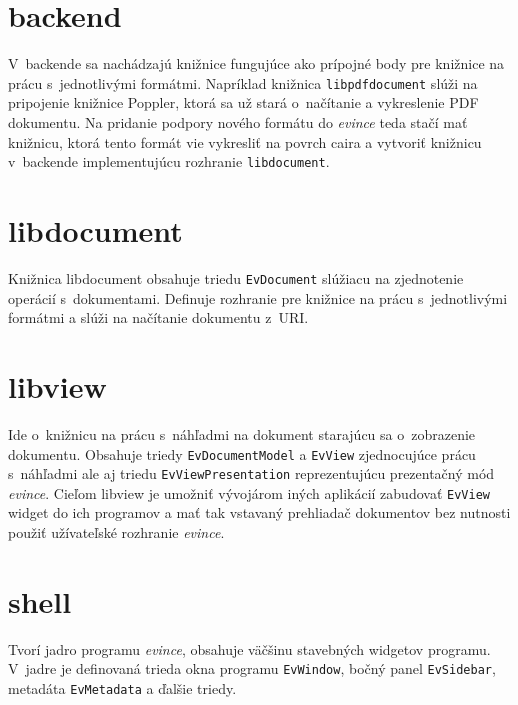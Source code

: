 \documentclass[12pt,oneside,final]{fithesis2}
\begin{document}
\section{backend}
V~backende sa nachádzajú knižnice fungujúce ako prípojné body pre knižnice na prácu s~jednotlivými formátmi. Napríklad knižnica \texttt{libpdfdocument} slúži na pripojenie knižnice Poppler, ktorá sa už stará o~načítanie a vykreslenie PDF dokumentu. Na pridanie podpory nového formátu do \emph{evince} teda stačí mať knižnicu, ktorá tento formát vie vykresliť na povrch caira a vytvoriť knižnicu v~backende implementujúcu rozhranie \texttt{libdocument}.
\section{libdocument}
Knižnica libdocument obsahuje triedu \texttt{EvDocument} slúžiacu na zjednotenie operácií s~dokumentami. Definuje rozhranie pre knižnice na prácu s~jednotlivými formátmi a slúži na načítanie dokumentu z~URI.
\section{libview}
Ide o~knižnicu na prácu s~náhľadmi na dokument starajúcu sa o~zobrazenie dokumentu. Obsahuje triedy \texttt{EvDocumentModel} a \texttt{EvView} zjednocujúce prácu s~náhľadmi ale aj triedu \texttt{EvViewPresentation} reprezentujúcu prezentačný mód \emph{evince}. Cieľom libview je umožniť vývojárom iných aplikácií zabudovať \texttt{EvView} widget do ich programov a mať tak vstavaný prehliadač dokumentov bez nutnosti použiť užívateľské rozhranie \emph{evince}.
\section{shell}
Tvorí jadro programu \emph{evince}, obsahuje väčšinu stavebných widgetov programu. V~jadre je definovaná trieda okna programu \texttt{EvWindow}, bočný panel \texttt{EvSidebar}, metadáta \texttt{EvMetadata} a ďalšie triedy.
\end{document}
